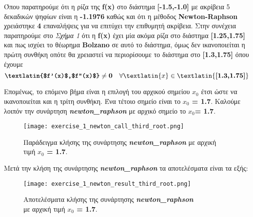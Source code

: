 \documentclass[First Project.tex]{subfiles}
\begin{document}
Όπου παρατηρούμε ότι η ρίζα της \textlatin{\textbf{f(x)}} στο διάστημα \textlatin{\textbf{[-1.5,-1.0]}} με ακρίβεια 5 δεκαδικών ψηφίων 
είναι η \textbf{-1.1976} καθώς και ότι η μέθοδος \textlatin{\textbf{Newton-Raphson}} χρειάστηκε \textbf{4} επαναλήψεις για να επιτύχει την επιθυμητή ακρίβεια.
Στην συνέχεια παρατηρούμε στο \textit{Σχήμα 1} ότι η \textlatin{\textbf{f(x)}} έχει μία ακόμα ρίζα στο διάστημα \textlatin{\textbf{[1.25,1.75]}} και
πως ισχύει το θέωρημα \textlatin{\textbf{Bolzano}} σε αυτό το διάστημα, όμως δεν ικανοποιείται η πρώτη συνθήκη οπότε θα χρειαστεί να 
περιορίσουμε το διάστημα στο \textlatin{\textbf{[1.3,1.75]}} όπου έχουμε 
\begin{equation*}
    \textbf{\textlatin{$f'(x)$,$f''(x)$}} \neq \textbf{0} \quad \forall \textlatin{x} \in \textlatin{\textbf{[1.3,1.75]}}
\end{equation*}

Επομένως, το επόμενο βήμα είναι η επιλογή του αρχικού σημείου \textbf{\textlatin{$x_{0}$}} έτσι ώστε να ικανοποιείται και η τρίτη συνθήκη.
Ένα τέτοιο σημείο είναι το \textbf{\textlatin{$x_{0}$ = 1.7}}.
Καλούμε λοιπόν την συνάρτηση \textit{\textlatin{\textbf{newton\_raphson}}} με αρχικό σημείο το \textlatin{\textbf{$x_{0}$= 1.7}}.
\vspace{5px}
\begin{figure}[hp]
    \centering
    \captionsetup{justification=centering}
    \begin{center}
        \texttt{[image: exercise\_1\_newton\_call\_third\_root.png]}    
        \caption{Παράδειγμα κλήσης της συνάρτησης \textit{\textlatin{\textbf{newton\_raphson}}} με αρχική τιμή \textbf{\textlatin{$x_{0}$ = 1.7}}.}
    \end{center}
\end{figure}


Μετά την κλήση της συνάρτησης \textit{\textlatin{\textbf{newton\_raphson}}} τα αποτελέσματα είναι τα εξής:
\vspace{5px}
\begin{figure}[h!]
    \centering
    \captionsetup{justification=centering}
    \begin{center}
    \texttt{[image: exercise\_1\_newton\_result\_third\_root.png]}    
    \caption{ Αποτελέσματα κλήσης της συνάρτησης \textit{\textlatin{\textbf{newton\_raphson}}} \\ με αρχική τιμή \textbf{\textlatin{$x_{0}$ = 1.7}}. }
    \end{center}
\end{figure}
\end{document}
